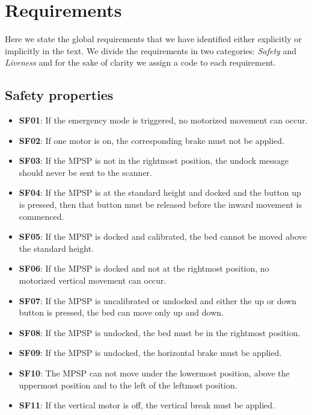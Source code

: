 \section{Requirements}

Here we state the global requirements that we have identified either explicitly
or implicitly in the text.
We divide the requirements in two categories: \emph{Safety} and \emph{Liveness}
and for the sake of clarity we assign a code to each
requirement.
\subsection{Safety properties}
\begin{itemize}
    \item \textbf{SF01}: If the emergency mode is triggered, no motorized movement can occur.
    \item \textbf{SF02}: If one motor is on, the corresponding brake must not be applied.
    \item \textbf{SF03}: If the MPSP is not in the rightmost position, the undock message should never be sent to the scanner.
    \item \textbf{SF04}: If the MPSP is at the standard height and docked and the button up is pressed, then that button must be released before the inward movement is commenced.
    \item \textbf{SF05}: If the MPSP is docked and calibrated, the bed cannot be moved above the standard height.
    \item \textbf{SF06}: If the MPSP is docked and not at the rightmost position, no motorized vertical movement can occur.
    \item \textbf{SF07}: If the MPSP is uncalibrated or undocked and either the up or down button is pressed, the bed can move only up and down.
    \item \textbf{SF08}: If the MPSP is undocked, the bed must be in the rightmost position.
    \item \textbf{SF09}: If the MPSP is undocked, the horizontal brake must be applied.
    \item \textbf{SF10}: The MPSP can not move under the lowermost position, above the uppermost position and to the left of the leftmost position.
    \item \textbf{SF11}: If the vertical motor is off, the vertical break must be applied.
\end{itemize}

